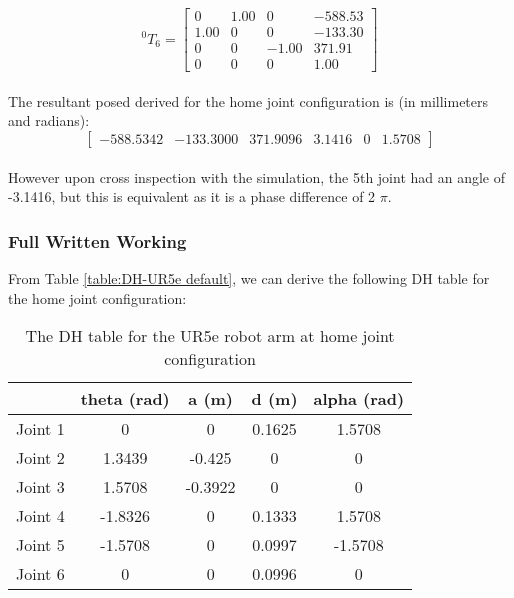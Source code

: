 \begin{equation*}
    ^{0}T_{6} = \begin{bmatrix}
        0    & 1.00 & 0     & -588.53 \\
        1.00 & 0    & 0     & -133.30 \\
        0    & 0    & -1.00 & 371.91  \\
        0    & 0    & 0     & 1.00
    \end{bmatrix}
\end{equation*}
\\The resultant posed derived for the home joint configuration is (in millimeters and radians):
\begin{equation*}
    \begin{bmatrix}
        -588.5342 & -133.3000 & 371.9096 & 3.1416 & 0 & 1.5708
    \end{bmatrix}
\end{equation*}
\\ However upon cross inspection with the simulation, the 5th joint had an angle of -3.1416, but this is equivalent as it is a phase difference of 2 $\pi$.
\subsubsection{Full Written Working}

From Table \ref{table:DH-UR5e default}, we can derive the following DH table for the home joint configuration:

\begin{table}[H]
    \centering
    \begin{tabular}{|c|c|c|c|c|}
        \hline
                & \textbf{theta (rad)} & \textbf{a (m)} & \textbf{d (m)} & \textbf{alpha (rad)} \\ \hline
        Joint 1 & 0                    & 0              & 0.1625         & 1.5708               \\ \hline
        Joint 2 & 1.3439               & -0.425         & 0              & 0                    \\ \hline
        Joint 3 & 1.5708               & -0.3922        & 0              & 0                    \\ \hline
        Joint 4 & -1.8326              & 0              & 0.1333         & 1.5708               \\ \hline
        Joint 5 & -1.5708              & 0              & 0.0997         & -1.5708              \\ \hline
        Joint 6 & 0                    & 0              & 0.0996         & 0                    \\ \hline
    \end{tabular}
    \caption{The DH table for the UR5e robot arm at home joint configuration}
    \label{table:DH-UR5e home}
\end{table}


